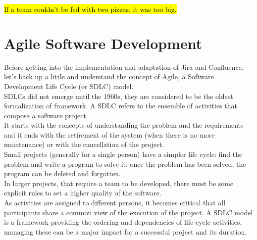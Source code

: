\begin{savequote}[75mm]
\hl{If a team couldn’t be fed with two pizzas, it was too big.}
\end{savequote}


\chapter{Agile Software Development}
\label{chapter_3}

Before getting into the implementation and adaptation of Jira and Confluence, let's back up a little and understand the concept of Agile, a Software Development Life Cycle (or SDLC) model.\\
SDLCs did not emerge until the 1960s, they are considered to be the oldest formalization of framework.
A SDLC refers to the ensemble of activities that compose a software project.\\
It starts with the concepts of understanding the problem and the requirements and it ends with the retirement of the system (when there is no more maintenance) or with the cancellation of the project.\\
Small projects (generally for a single person) have a simpler life cycle: find the problem and write a program to solve it: once the problem has been solved, the program can be deleted and forgotten.\\
In larger projects, that require a team to be developed, there must be some explicit rules to set a higher quality of the software.\\
As activities are assigned to different persons, it becomes critical that all participants share a common view of the execution of the project.
A SDLC model is a framework providing the ordering and dependencies of life cycle activities, 
managing these can be a major impact for a successful project and its duration.\\
